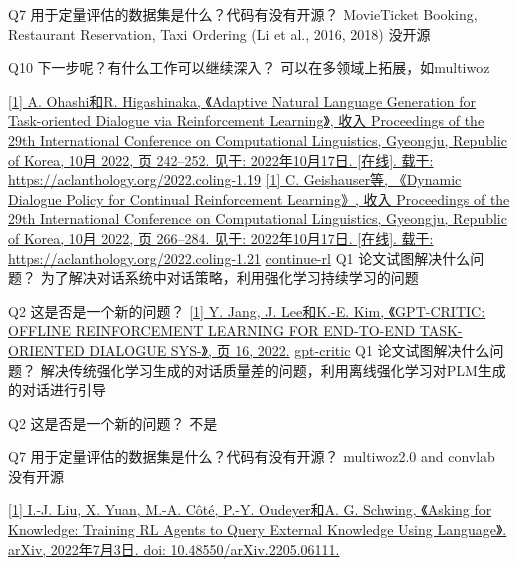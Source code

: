 \documentclass[11pt]{article}
\begin{document}
Q7 用于定量评估的数据集是什么？代码有没有开源？
 MovieTicket Booking, Restaurant Reservation, Taxi Ordering (Li et al., 2016, 2018)
 没开源

Q10 下一步呢？有什么工作可以继续深入？
可以在多领域上拓展，如multiwoz

\href{//select/items/1\_NYQZCULP}{[1] A. Ohashi和R. Higashinaka, 《Adaptive Natural Language Generation for Task-oriented Dialogue via Reinforcement Learning》, 收入 Proceedings of the 29th International Conference on Computational Linguistics, Gyeongju, Republic of Korea, 10月 2022, 页 242–252. 见于: 2022年10月17日. [在线]. 载于: https://aclanthology.org/2022.coling-1.19}
\href{//select/items/1\_85XTRJ6T}{[1] C. Geishauser等, 《Dynamic Dialogue Policy for Continual Reinforcement Learning》, 收入 Proceedings of the 29th International Conference on Computational Linguistics, Gyeongju, Republic of Korea, 10月 2022, 页 266–284. 见于: 2022年10月17日. [在线]. 载于: https://aclanthology.org/2022.coling-1.21} \href{20221020142352.org}{continue-rl}
  Q1 论文试图解决什么问题？
为了解决对话系统中对话策略，利用强化学习持续学习的问题

Q2 这是否是一个新的问题？
\href{//select/items/1\_GQ5SG5IV}{[1] Y. Jang, J. Lee和K.-E. Kim, 《GPT-CRITIC: OFFLINE REINFORCEMENT LEARNING FOR END-TO-END TASK-ORIENTED DIALOGUE SYS-》, 页 16, 2022.} \href{20221020143336.org}{gpt-critic}
    Q1 论文试图解决什么问题？
解决传统强化学习生成的对话质量差的问题，利用离线强化学习对PLM生成的对话进行引导

Q2 这是否是一个新的问题？
不是

Q7 用于定量评估的数据集是什么？代码有没有开源？
multiwoz2.0 and convlab
没有开源

\href{//select/items/1\_IUKACNSI}{[1] I.-J. Liu, X. Yuan, M.-A. Côté, P.-Y. Oudeyer和A. G. Schwing, 《Asking for Knowledge: Training RL Agents to Query External Knowledge Using Language》. arXiv, 2022年7月3日. doi: 10.48550/arXiv.2205.06111.}
\end{document}
